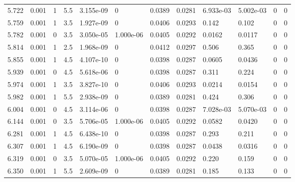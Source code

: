 \documentclass[preview]{standalone}
\begin{document}
{{{{\begin{tabular}{L{1.2cm}C{1.2cm} C{0.3cm}C{0.5cm} C{1.4cm}C{1.4cm} C{1.4cm}C{1.4cm} C{1.6cm}C{1.6cm} C{1.6cm}C{1.6cm}}
  5.722  &  0.001  & 1     & 5.5 &  3.155e-09  & 0  &  0.0389&   0.0281& 6.933e-03 & 5.002e-03   &  0 & 0  \\ 
  5.759  &  0.001  & 1     & 3.5 &  1.927e-09  & 0  &  0.0406&   0.0293& 0.142 & 0.102   &  0 & 0  \\ 
  5.782  &  0.001  & 0     & 3.5 &  3.050e-05  & 1.000e-06  &  0.0405&   0.0292& 0.0162 & 0.0117   &  0 & 0  \\ 
  5.814  &  0.001  & 1     & 2.5 &  1.968e-09  & 0  &  0.0412&   0.0297& 0.506 & 0.365   &  0 & 0  \\ 
  5.855  &  0.001  & 1     & 4.5 &  4.107e-10  & 0  &  0.0398&   0.0287& 0.0605 & 0.0436   &  0 & 0  \\ 
  5.939  &  0.001  & 0     & 4.5 &  5.618e-06  & 0  &  0.0398&   0.0287& 0.311 & 0.224   &  0 & 0  \\ 
  5.974  &  0.001  & 1     & 3.5 &  3.827e-10  & 0  &  0.0406&   0.0293& 0.0214 & 0.0154   &  0 & 0  \\ 
  5.982  &  0.001  & 1     & 5.5 &  2.938e-09  & 0  &  0.0389&   0.0281& 0.424 & 0.306   &  0 & 0  \\ 
  6.004  &  0.001  & 0     & 4.5 &  3.114e-06  & 0  &  0.0398&   0.0287& 7.028e-03 & 5.070e-03   &  0 & 0  \\ 
  6.144  &  0.001  & 0     & 3.5 &  5.706e-05  & 1.000e-06  &  0.0405&   0.0292& 0.0582 & 0.0420   &  0 & 0  \\ 
  6.281  &  0.001  & 1     & 4.5 &  6.438e-10  & 0  &  0.0398&   0.0287& 0.293 & 0.211   &  0 & 0  \\ 
  6.307  &  0.001  & 1     & 4.5 &  6.190e-09  & 0  &  0.0398&   0.0287& 0.0438 & 0.0316   &  0 & 0  \\ 
  6.319  &  0.001  & 0     & 3.5 &  5.070e-05  & 1.000e-06  &  0.0405&   0.0292& 0.220 & 0.159   &  0 & 0  \\ 
  6.350  &  0.001  & 1     & 5.5 &  2.609e-09  & 0  &  0.0389&   0.0281& 0.185 & 0.133   &  0 & 0  \\ 
\hline 
\end{tabular} 

}}}}
\end{document}
